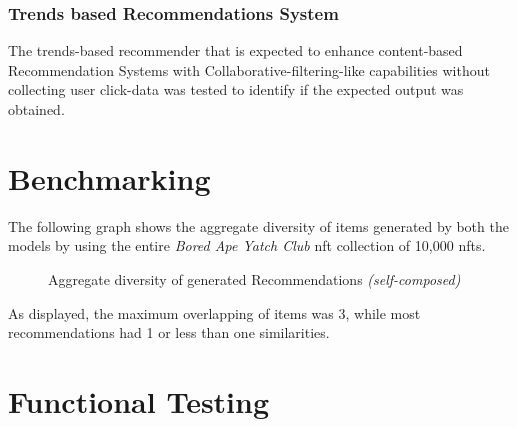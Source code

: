\subsubsection{Trends based Recommendations System}


The trends-based recommender that is expected to enhance content-based Recommendation Systems with Collaborative-filtering-like capabilities without collecting user click-data was tested to identify if the expected output was obtained.


\section{Benchmarking}
\label{sec:test-benchmarking}

The following graph shows the aggregate diversity of items generated by both the models by using the entire \textit{Bored Ape Yatch Club} \gls{nft} collection of 10,000 \gls{nft}s.

\begin{figure}[h!]
\centering
{}
\caption{Aggregate diversity of generated Recommendations \textit{(self-composed)}}
\label{fig:aggregate-diversity-traits}
\end{figure}

\noindent As displayed, the maximum overlapping of items was 3, while most recommendations had 1 or less than one similarities.



\section{Functional Testing}


